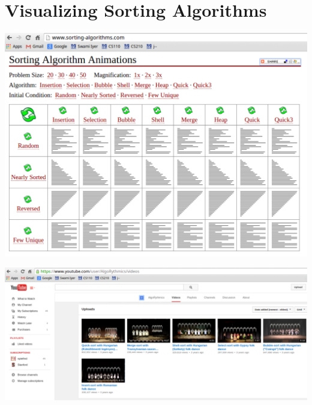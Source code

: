 \documentclass[8pt,a4paper,compress]{beamer}
\begin{document}
\section{Visualizing Sorting Algorithms}
\begin{frame}[fragile]
\begin{center}
\includegraphics[scale=0.3]{./figures/algorithm_animations.pdf}
\end{center}
\end{frame}

\begin{frame}[fragile]
\begin{center}
\includegraphics[scale=0.23]{./figures/algorithm_videos.pdf}
\end{center}
\end{frame}
\end{document}
